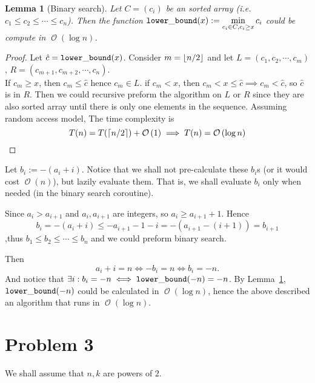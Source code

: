 \documentclass[12pt, a4paper]{article}
\DeclarePairedDelimiter{\ceil}{\lceil}{\rceil}
\DeclarePairedDelimiter{\floor}{\lfloor}{\rfloor}
\newcommand{\opord}{\operatorname{\mathcal{O}}}
\newcommand{\ord}[1]{\opord\left(#1\right)}
\newtheorem{lemma}{Lemma}
\begin{document}
\newcommand{\lowb}{\mathtt{lower\char`_bound}}
\begin{lemma}[Binary search] \label{le:lowb}
  Let $C = (c_i)$ be an sorted array (i.e. $c_1 \leq c_2 \leq \cdots \leq c_n$). Then the function 
  \( \lowb(x) := \min\limits_{c_i \in C, c_i \geq x} c_i \) could be compute in $\ord{\log n}$.
\end{lemma}
\begin{proof}
Let $\hat{c} = \lowb(x)$. Consider $m = \floor{n/2}$ and let $L = (c_1, c_2, \cdots, c_m)$, 
$R = (c_{m+1}, c_{m+2}, \cdots, c_n)$. \\
If $c_m \geq x$, then $c_m \leq \hat{c}$ hence $c_m \in L$.
if $c_m < x$, then $c_m < x \leq \hat{c} \implies c_m < \hat{c}$, so $\hat{c}$ is in $R$.
Then we could recursive preform the algorithm on $L$ or $R$ since they are also sorted array 
until there is only one elements in the sequence. Assuming random access model, The time complexity is
\[ T(n) = T(\ceil{n/2}) + \ord{1} \implies T(n) = \ord{\log n} \]
\end{proof}

Let $b_i := -(a_i + i)$. Notice that we shall not pre-calculate these $b_i$s (or it would cost $\ord{n}$), 
but lazily evaluate them. That is, we shall evaluate $b_i$ only when needed (in the binary search coroutine).

Since $a_i > a_{i+1}$ and $a_i, a_{i+1}$ are integers, so $a_i \geq a_{i+1} + 1$. Hence
\[ b_i = -(a_i + i) \leq -a_{i+1} - 1 - i = -(a_{i+1} - (i+1)) = b_{i+1} \]
,thus $b_1 \leq b_2 \leq \cdots \leq b_n$ and we could preform binary search.

Then \[ a_i + i = n \iff -b_i = n \iff b_i = -n. \]
And notice that $\exists i: b_i = -n \iff \lowb(-n) = -n$. By Lemma~\ref{le:lowb}, $\lowb(-n)$ could be 
calculated in $\ord{\log n}$, hence the above described an algorithm that runs in $\ord{\log n}$.

\section{Problem 3}
We shall assume that $n, k$ are powers of $2$.
\end{document}
